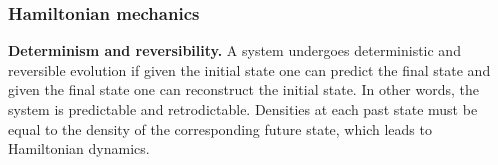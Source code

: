 \documentclass[twocolumn]{article}
\newif\ifextended
\newcommand\fact[2]{\ifextended \emph{#1}.#2 \fi}
\begin{document}
\fact{Precise physics-math correspondence} {These results gives us a precise understanding of what each layer of the mathematical structure corresponds to physically:
\begin{description}[noitemsep]
	\item \emph{Set of points:} possible states for the particles.
	\item \emph{Topological space:} ability to experimentally distinguish the states.
	\item \emph{Manifold:} states can be distinguished with a set of real valued quantities or state variables.
	\item \emph{Differentiable manifold:} we can define a distribution over the states and the state variables.
	\item \emph{Symplectic manifold:} we can define a distribution over the states that are coordinate independent.
\end{description}}

\subsubsection{Hamiltonian mechanics}

\textbf{Determinism and reversibility.} A system undergoes deterministic and reversible evolution if given the initial state one can predict the final state and given the final state one can reconstruct the initial state. In other words, the system is predictable and retrodictable. Densities at each past state must be equal to the density of the corresponding future state, which leads to Hamiltonian dynamics.
\end{document}
